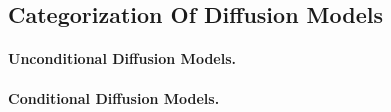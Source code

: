 \subsection{Categorization Of Diffusion Models}

\paragraph{Unconditional Diffusion Models.}

\paragraph{Conditional Diffusion Models.}


